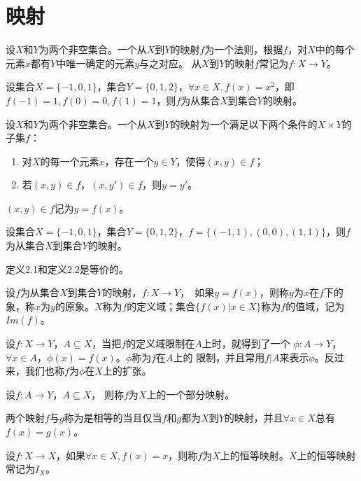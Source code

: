 \chapter{映射}

  \begin{Def}
    设$X$和$Y$为两个非空集合。一个从$X$到$Y$的映射$f$为一个法则，根据$f$，对$X$中的每个元素$x$都有$Y$中唯一确定的元素$y$与之对应。
    从$X$到$Y$的映射$f$常记为$f:X\to Y$。
  \end{Def}

  \begin{Example}
    设集合$X=\{-1,0,1\}$，集合$Y=\{0,1,2\}$，$\forall x \in X, f(x)=x^2$，即$f(-1)=1,f(0)=0,f(1)=1$，则$f$为从集合$X$到集合$Y$的映射。
  \end{Example}

  \begin{Def}
    设$X$和$Y$为两个非空集合。一个从$X$到$Y$的映射为一个满足以下两个条件的$X\times Y$的子集$f$：
    \begin{enumerate}
    \item 对$X$的每一个元素$x$，存在一个$y\in Y$，使得$(x,y) \in f$；
    \item 若$(x,y)\in f$，$(x,y')\in f$，则$y=y'$。
    \end{enumerate}
    $(x,y)\in f$记为$y=f(x)$。
  \end{Def}
  \begin{Example}
    设集合$X=\{-1,0,1\}$，集合$Y=\{0,1,2\}$，$f=\{(-1,1),(0,0),(1,1)\}$，则$f$为从集合$X$到集合$Y$的映射。
  \end{Example}

  定义2.1和定义2.2是等价的。
  \begin{Def}
    设$f$为从集合$X$到集合$Y$的映射，$f:X\to Y$，　如果$y = f(x)$，则称$y$为$x$在$f$下的象，称$x$为$y$的原象。$X$称为$f$的定义域；集合$\{f(x) | x \in X\}$称为$f$的值域，记为$Im(f)$。
  \end{Def}
  \begin{Def}
    设$f:X\to Y$，$A\subseteq X$，当把$f$的定义域限制在$A$上时，就得到了一个
    $\phi: A\to Y$，$\forall x \in A$，$\phi(x) = f(x)$。$\phi$称为$f$在$A$上的
    限制，并且常用$f|A$来表示$\phi$。反过来，我们也称$f$为$\phi$在$X$上的扩张。
  \end{Def}
    \begin{Def}
    设$f:A \to Y$，$A \subseteq X$， 则称$f$为$X$上的一个部分映射。
  \end{Def}
  \begin{Def}
    两个映射$f$与$g$称为是相等的当且仅当$f$和$g$都为$X$到$Y$的映射，并且$\forall x \in X$总有$f(x) = g(x)$。
  \end{Def}
  \begin{Def}
    设$f:X\to X$，如果$\forall x \in X, f(x) = x$，则称$f$为$X$上的恒等映射。$X$上的恒等映射常记为$I_X$。
  \end{Def}

